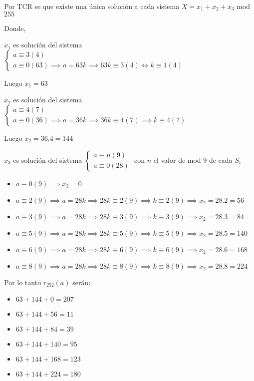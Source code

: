 Por TCR se que existe una única solución a cada sistema $ X = x_1 + x_2 + x_3 $ mod $255$

Donde,

$ x_1 $ es solución del sistema $ \begin{cases}
    a \equiv 3(4) \\
    a \equiv 0(63) \implies a = 63k \implies 63k \equiv 3(4) \iff k \equiv 1(4)
\end{cases} $

Luego $x_1 = 63$

$ x_2 $ es solución del sistema $ \begin{cases}
    a \equiv 4(7) \\
    a \equiv 0(36) \implies a = 36k \implies 36k \equiv 4(7) \implies k \equiv 4(7)
\end{cases} $

Luego $x_2 = 36.4 = 144 $

$ x_3 $ es solución del sistema $ \begin{cases}
    a \equiv n(9) \\
    a \equiv 0(28)
\end{cases} $ con $n$ el valor de mod 9 de cada $S_i$

\begin{itemize}
    \item $ a \equiv 0(9) \implies x_3 = 0 $
    \item $ a \equiv 2(9) \implies a = 28k \implies 28k \equiv 2(9) \implies k \equiv 2(9) \implies x_2 = 28.2 = 56 $
    \item $ a \equiv 3(9) \implies a = 28k \implies 28k \equiv 3(9) \implies k \equiv 3(9) \implies x_2 = 28.3 = 84 $
    \item $ a \equiv 5(9) \implies a = 28k \implies 28k \equiv 5(9) \implies k \equiv 5(9) \implies x_2 = 28.5 = 140 $
    \item $ a \equiv 6(9) \implies a = 28k \implies 28k \equiv 6(9) \implies k \equiv 6(9) \implies x_2 = 28.6 = 168 $
    \item $ a \equiv 8(9) \implies a = 28k \implies 28k \equiv 8(9) \implies k \equiv 8(9) \implies x_2 = 28.8 = 224 $
\end{itemize}

Por lo tanto $ r_{252}(a) $ serán:
\begin{itemize}
    \item $ 63 + 144 + 0 = 207 $
    \item $ 63 + 144 + 56 = 11 $
    \item $ 63 + 144 + 84 = 39 $
    \item $ 63 + 144 + 140 = 95 $
    \item $ 63 + 144 + 168 = 123 $
    \item $ 63 + 144 + 224 = 180 $
\end{itemize}


